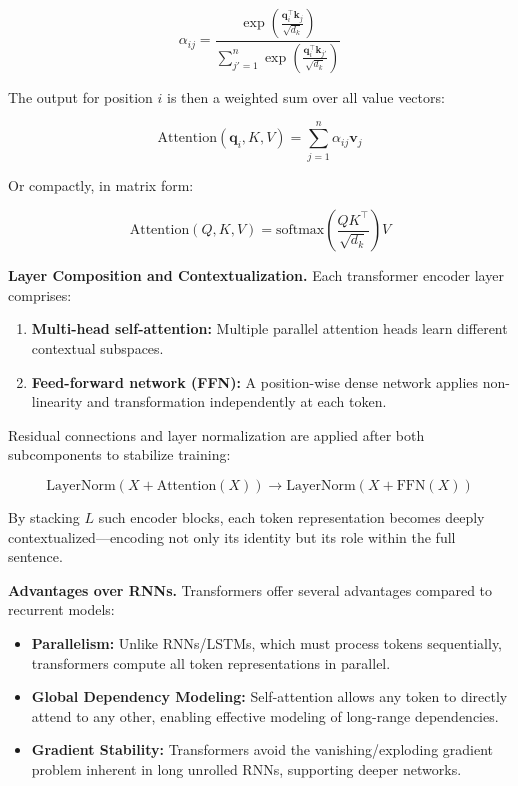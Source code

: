 \documentclass{article}
\begin{document}
\[
\alpha_{ij} = \frac{\exp\left(\frac{\mathbf{q}_i^\top \mathbf{k}_j}{\sqrt{d_k}}\right)}{\sum_{j'=1}^{n} \exp\left(\frac{\mathbf{q}_i^\top \mathbf{k}_{j'}}{\sqrt{d_k}}\right)}
\]

The output for position $i$ is then a weighted sum over all value vectors:

\[
\text{Attention}(\mathbf{q}_i, K, V) = \sum_{j=1}^{n} \alpha_{ij} \mathbf{v}_j
\]

Or compactly, in matrix form:

\[
\text{Attention}(Q, K, V) = \text{softmax}\left( \frac{QK^\top}{\sqrt{d_k}} \right)V
\]

\vspace{2mm}
\noindent\textbf{Layer Composition and Contextualization.}  
Each transformer encoder layer comprises:
\begin{enumerate}
    \item \textbf{Multi-head self-attention:} Multiple parallel attention heads learn different contextual subspaces.
    \item \textbf{Feed-forward network (FFN):} A position-wise dense network applies non-linearity and transformation independently at each token.
\end{enumerate}

Residual connections and layer normalization are applied after both subcomponents to stabilize training:

\[
\text{LayerNorm}(X + \text{Attention}(X)) \rightarrow \text{LayerNorm}(X + \text{FFN}(X))
\]

By stacking $L$ such encoder blocks, each token representation becomes deeply contextualized—encoding not only its identity but its role within the full sentence.

\vspace{3mm}
\noindent\textbf{Advantages over RNNs.}  
Transformers offer several advantages compared to recurrent models:

\begin{itemize}
    \item \textbf{Parallelism:} Unlike RNNs/LSTMs, which must process tokens sequentially, transformers compute all token representations in parallel.
    \item \textbf{Global Dependency Modeling:} Self-attention allows any token to directly attend to any other, enabling effective modeling of long-range dependencies.
    \item \textbf{Gradient Stability:} Transformers avoid the vanishing/exploding gradient problem inherent in long unrolled RNNs, supporting deeper networks.
\end{itemize}
\end{document}
